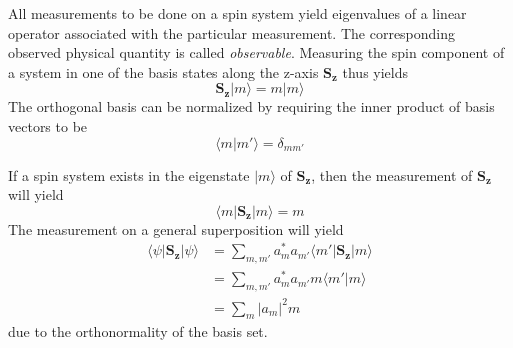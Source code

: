 \documentclass[11.5pt,a4paper]{article}
\begin{document}
All measurements to be done on a spin system yield eigenvalues of a linear operator associated with the particular measurement. The corresponding observed physical quantity is called \emph{observable}. Measuring the spin component of a system in one of the basis states along the z-axis $\mathbf{S_z}$ thus yields
\begin{equation}
  \mathbf{S_z} |m\rangle = m |m\rangle
\end{equation}
The orthogonal basis can be normalized by requiring the inner product of basis vectors to be
\begin{equation}
 \langle m|m'\rangle = \delta_{m m'}
  \label{eq-orthonormality}
\end{equation}

If a spin system exists in the eigenstate $|m\rangle$ of $\mathbf{S_z}$, then the measurement of $\mathbf{S_z}$ will yield
\begin{equation}
 \langle m | \mathbf{S_z} | m \rangle = m
\end{equation}
The measurement on a general superposition will yield
\begin{align}
 \langle \psi | \mathbf{S_z} | \psi \rangle & = \sum_{m,m'} a_m^* a_{m'} \langle m' | \mathbf{S_z} | m \rangle\\
  & = \sum_{m,m'} a_m^* a_{m'} m \langle m' | m \rangle\\
  & = \sum_{m} |a_{m}|^2  m
\end{align}
due to the orthonormality of the basis set.
\end{document}
